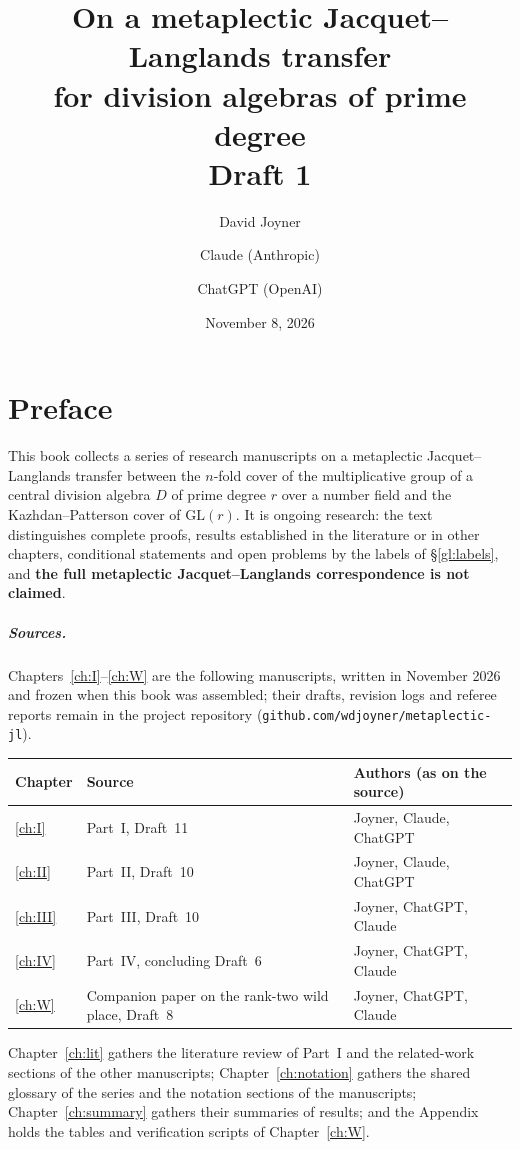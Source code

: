 \documentclass[11pt,oneside]{book}
\title{On a metaplectic Jacquet--Langlands transfer\\ for division algebras of prime degree\\[1em]
\large Draft 1}
\author{David Joyner \and Claude (Anthropic) \and ChatGPT (OpenAI)}
\date{November 8, 2026}
\theoremstyle{plain}
\theoremstyle{definition}
\begin{document}
\frontmatter
\maketitle
\tableofcontents

\chapter{Preface}
This book collects a series of research manuscripts on a metaplectic
Jacquet--Langlands transfer between the $n$-fold cover of the
multiplicative group of a central division algebra $D$ of prime degree
$r$ over a number field and the Kazhdan--Patterson cover of
$\mathrm{GL}(r)$.  It is ongoing research: the text distinguishes
complete proofs, results established in the literature or in other
chapters, conditional statements and open problems by the labels of
\S\ref{gl:labels}, and \textbf{the full metaplectic Jacquet--Langlands
correspondence is not claimed}.

\paragraph{Sources.}  Chapters~\ref{ch:I}--\ref{ch:W} are the
following manuscripts, written in November 2026 and frozen when this
book was assembled; their drafts, revision logs and referee reports
remain in the project repository
(\texttt{github.com/wdjoyner/metaplectic-jl}).
\begin{center}\small
\begin{tabular}{@{}lll@{}}\toprule
Chapter & Source & Authors (as on the source)\\\midrule
\ref{ch:I} & Part~I, Draft~11 & Joyner, Claude, ChatGPT\\
\ref{ch:II} & Part~II, Draft~10 & Joyner, Claude, ChatGPT\\
\ref{ch:III} & Part~III, Draft~10 & Joyner, ChatGPT, Claude\\
\ref{ch:IV} & Part~IV, concluding Draft~6 & Joyner, ChatGPT, Claude\\
\ref{ch:W} & Companion paper on the rank-two wild place, Draft~8 & Joyner, ChatGPT, Claude\\
\bottomrule\end{tabular}
\end{center}
Chapter~\ref{ch:lit} gathers the literature review of Part~I and the
related-work sections of the other manuscripts; Chapter~\ref{ch:notation}
gathers the shared glossary of the series and the notation sections of
the manuscripts; Chapter~\ref{ch:summary} gathers their summaries of
results; and the Appendix holds the tables and verification scripts of
Chapter~\ref{ch:W}.
\end{document}
